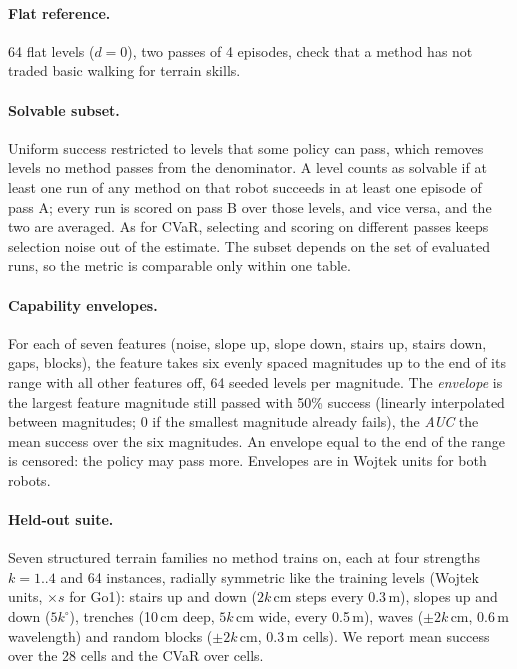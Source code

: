 \paragraph{Flat reference.} 64 flat levels ($d=0$), two passes of 4
episodes, check that a method has not traded basic walking for terrain
skills.

\paragraph{Solvable subset.} Uniform success restricted to levels that some
policy can pass, which removes levels no method passes from the
denominator. A level counts as solvable if at least one run of any method
on that robot succeeds in at least one episode of pass A; every run is
scored on pass B over those levels, and vice versa, and the two are
averaged. As for CVaR, selecting and scoring on different passes keeps
selection noise out of the estimate. The subset depends on the set of
evaluated runs, so the metric is comparable only within one table.

\paragraph{Capability envelopes.} For each of seven features (noise,
slope up, slope down, stairs up, stairs down, gaps, blocks), the feature
takes six evenly spaced magnitudes up to the end of its range with all
other features off, 64 seeded levels per magnitude. The \emph{envelope} is
the largest feature magnitude still passed with 50\% success (linearly
interpolated between magnitudes; 0 if the smallest magnitude already
fails), the \emph{AUC} the mean success over the six magnitudes. An
envelope equal to the end of the range is censored: the policy may pass
more. Envelopes are in Wojtek units for both robots.

\paragraph{Held-out suite.} Seven structured terrain families no method
trains on, each at four strengths $k=1..4$ and 64 instances, radially
symmetric like the training levels (Wojtek units, $\times s$ for Go1):
stairs up and down ($2k$\,cm steps every 0.3\,m), slopes up and down
($5k^\circ$), trenches (10\,cm deep, $5k$\,cm wide, every 0.5\,m), waves
($\pm2k$\,cm, 0.6\,m wavelength) and random blocks ($\pm2k$\,cm, 0.3\,m
cells). We report mean success over the 28 cells and the CVaR over cells.

